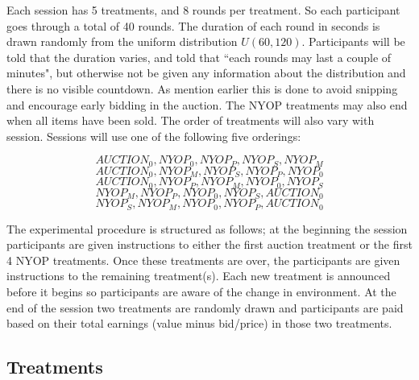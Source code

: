 \documentclass[a4paper,12pt]{article}
\begin{document}
	Each session has 5 treatments, and 8 rounds per treatment. So each participant goes through a total of 40 rounds. The duration of each round in seconds is drawn randomly from the uniform distribution $U(60, 120)$. Participants will be told that the duration varies, and told that ``each rounds may last a couple of minutes", but otherwise not be given any information about the distribution and there is no visible countdown. As mention earlier this is done to avoid snipping and encourage early bidding in the auction. The NYOP treatments may also end when all items have been sold. The order of treatments will also vary with session. Sessions will use one of the following five orderings:

\[	{AUCTION_0, NYOP_0, NYOP_P, NYOP_S, NYOP_M} \]
\[	{AUCTION_0, NYOP_M, NYOP_S, NYOP_P, NYOP_0} \]
\[	{AUCTION_0, NYOP_P, NYOP_M, NYOP_0, NYOP_S} \]
\[	{NYOP_M, NYOP_P, NYOP_0, NYOP_S, AUCTION_0} \]
\[	{NYOP_S, NYOP_M, NYOP_0, NYOP_P, AUCTION_0} \]
	
	The experimental procedure is structured as follows; at the beginning the session participants are given instructions to either the first auction treatment or the first 4 NYOP treatments. Once these treatments are over, the participants are given instructions to the remaining treatment(s). Each new treatment is announced before it begins so participants are aware of the change in environment. At the end of the session two treatments are randomly drawn and participants are paid based on their total earnings (value minus bid/price) in those two treatments.

	\subsection{Treatments}
\end{document}
